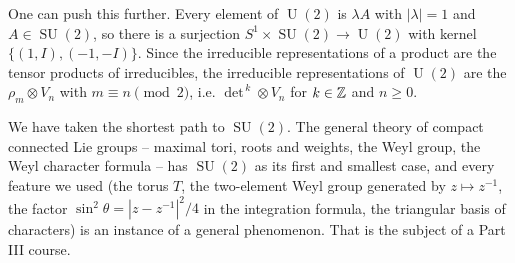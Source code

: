 \documentclass[a4paper]{scrartcl}
\newcommand{\U}{\operatorname{U}}
\newcommand{\SU}{\operatorname{SU}}
\begin{document}
\begin{example}[$\SO(3)$ and $\SU(2)$ inside $\U(2)$]
	One can push this further. Every element of $\U(2)$ is $\lambda A$ with $|\lambda| = 1$ and $A\in\SU(2)$, so there is a surjection $S^1\times\SU(2)\to\U(2)$ with kernel $\{(1,I),(-1,-I)\}$. Since the irreducible representations of a product are the tensor products of irreducibles, the irreducible representations of $\U(2)$ are the $\rho_m\otimes V_n$ with $m\equiv n\pmod 2$, i.e. $\det^{\,k}\otimes V_n$ for $k \in\mathbb{Z}$ and $n\geq0$.
\end{example}

\begin{remark}
	We have taken the shortest path to $\SU(2)$. The general theory of compact connected Lie groups -- maximal tori, roots and weights, the Weyl group, the Weyl character formula -- has $\SU(2)$ as its first and smallest case, and every feature we used (the torus $T$, the two-element Weyl group generated by $z\mapsto z^{-1}$, the factor $\sin^2\theta = |z - z^{-1}|^2/4$ in the integration formula, the triangular basis of characters) is an instance of a general phenomenon. That is the subject of a Part III course.
\end{remark}
\end{document}

